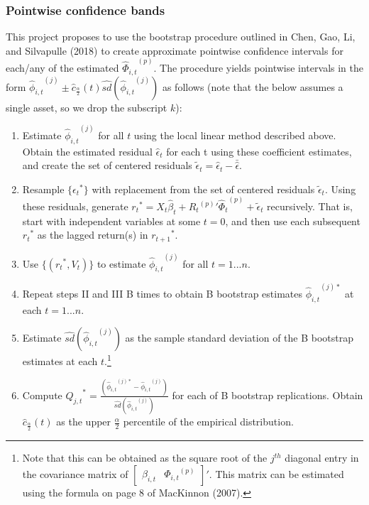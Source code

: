 \documentclass{article}
\begin{document}
\subsubsection{Pointwise confidence bands}
This project proposes to use the bootstrap procedure outlined in Chen, Gao, Li, and Silvapulle (2018) to create approximate pointwise confidence intervals for each/any of the estimated \({{\hat{\Phi}}_{i,t}}^{(p)}\). The procedure yields pointwise intervals in the form \({{\hat{\phi}}_{i,t}}^{(j)} \pm \hat{c}_{\frac{\alpha}{2}}(t) \hat{sd}({{\hat{\phi}}_{i,t}}^{(j)})\) as follows (note that the below assumes a single asset, so we drop the subscript \(k\)):
\renewcommand{\theenumi}{\Roman{enumi}}
\begin{enumerate}
	\item{Estimate \({{\hat{\phi}}_{i,t}}^{(j)}\) for all \(t\) using the local linear method described above. Obtain the estimated residual \(\hat{\epsilon}_{t}\) for each t using these coefficient estimates, and create the set of centered residuals \(\tilde{\epsilon}_{t} = \hat{\epsilon}_{t} - \bar{\hat{\epsilon}}\).}
	\item{Resample \( \{ {\epsilon_{t}}^{*} \} \) with replacement from the set of centered residuals \(\tilde{\epsilon}_{t}\). Using these residuals, generate \({r_{t}}^{*} =  X_{t}\hat{\beta}_{t} + {{R_{t}}^{(p)}}' {\hat{\Phi}_{t}}^{(p)} + \tilde{\epsilon}_{t}\) recursively. That is, start with independent variables at some \(t = 0\), and then use each subsequent \({r_{t}}^{*}\) as the lagged return(s) in \({r_{t+1}}^{*}\).}
	\item{Use \( \{ ({r_{t}}^{*}, V_{t})\}\) to estimate \({{\hat{\phi}}_{i,t}}^{(j)}\) for all \(t = 1 ... n\).}
	\item{Repeat steps II and III B times to obtain B bootstrap estimates \({{\hat{\phi}}_{i,t}}^{(j)*}\) at each \(t = 1 ... n\).}
	\item{Estimate \(\hat{sd}({{\hat{\phi}}_{i,t}}^{(j)})\) as the sample standard deviation of the B bootstrap estimates at each \(t\).\footnote{Note that this can be obtained as the square root of the \(j^{th}\) diagonal entry in the covariance matrix of \({\begin{bmatrix}\beta_{i,t} &{\Phi_{i,t}}^{(p)}\end{bmatrix}}' \). This matrix can be estimated using the formula on page 8 of MacKinnon (2007).} }
	\item{Compute \({Q_{j,t}}^{*} = \frac{({{\hat{\phi}}_{i,t}}^{(j)*} - {{\hat{\phi}}_{i,t}}^{(j)})}{\hat{sd}({{\hat{\phi}}_{i,t}}^{(j)})} \) for each of B bootstrap replications. Obtain \(\hat{c}_{\frac{\alpha}{2}}(t)\) as the upper \(\frac{\alpha}{2}\) percentile of the empirical distribution.} 
\end{enumerate}
\end{document}
